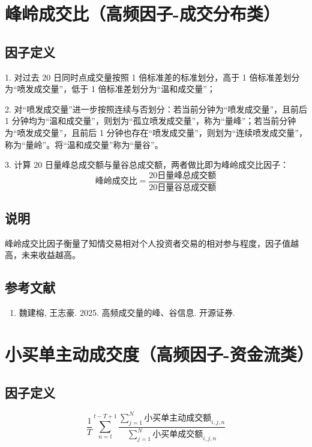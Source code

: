 \documentclass{article}
\begin{document}
\section{峰岭成交比（高频因子-成交分布类）}

\subsection{因子定义}

1. 对过去 20 日同时点成交量按照 1 倍标准差的标准划分，高于 1 倍标准差划分为“喷发成交量”，低于 1 倍标准差划分为“温和成交量”；

2. 对“喷发成交量”进一步按照连续与否划分：若当前分钟为“喷发成交量”，且前后 1 分钟均为“温和成交量”，则划为“孤立喷发成交量”，称为“量峰”；若当前分钟为“喷发成交量”，且前后 1 分钟也存在“喷发成交量”，则划为“连续喷发成交量”，称为“量岭”。将“温和成交量”称为“量谷”。

3. 计算 20 日量峰总成交额与量谷总成交额，两者做比即为峰岭成交比因子：
\begin{equation}
    \text{峰岭成交比} = \frac{\text{20日量峰总成交额}}{\text{20日量谷总成交额}}
\end{equation}

\subsection{说明}
峰岭成交比因子衡量了知情交易相对个人投资者交易的相对参与程度，因子值越高，未来收益越高。

\subsection{参考文献}
\begin{enumerate}
    \item 魏建榕, 王志豪. 2025. 高频成交量的峰、谷信息. 开源证券.
\end{enumerate}

\section{小买单主动成交度（高频因子-资金流类）}

\subsection{因子定义}
\begin{equation}
    \frac{1}{T} \sum_{n=t}^{t-T+1} \frac{\sum_{j=1}^{N} \text{小买单主动成交额}_{i,j,n}}{\sum_{j=1}^{N} \text{小买单成交额}_{i,j,n}}
\end{equation}
\end{document}
